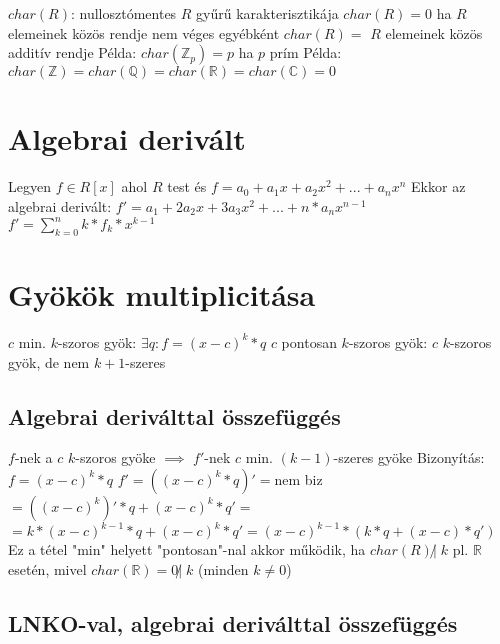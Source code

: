\documentclass[12pt,a4paper]{article}
\begin{document}
\begin{outline}
	\1 $char(R)$: nullosztómentes $R$ gyűrű karakterisztikája
		\2 $char(R)=0$ ha $R$ elemeinek közös rendje nem véges
		\2 egyébként $char(R)=$ $R$ elemeinek közös additív rendje
	\1 Példa: $char(\mathbb{Z}_p) = p$ ha $p$ prím
	\1 Példa: $char(\mathbb{Z})=char(\mathbb{Q})=char(\mathbb{R})=char(\mathbb{C})=0$
\end{outline}

\pagebreak

\section{Algebrai derivált}

\begin{outline}
	\1 Legyen $f \in R[x]$ ahol $R$ test és $f=a_0+a_1x+a_2x^2+...+a_nx^n$
	\1 Ekkor az algebrai derivált: $f'=a_1+2a_2x+3a_3x^2+...+n*a_nx^{n-1}$
		\2 $f'=\sum_{k=0}^{n} k*f_k*x^{k-1}$
\end{outline}

\section{Gyökök multiplicitása}

\begin{outline}
	\1 $c$ min. $k$-szoros gyök: $\exists q: f=(x-c)^k*q$
	\1 $c$ pontosan $k$-szoros gyök: $c$ $k$-szoros gyök, de nem $k+1$-szeres
\end{outline}

\subsection{Algebrai deriválttal összefüggés}

\begin{outline}
	\1 $f$-nek a $c$ $k$-szoros gyöke $\implies$ $f'$-nek $c$ min. $(k-1)$-szeres gyöke
	\1 Bizonyítás:
		\2 $f=(x-c)^k*q$
		\2 $f'=((x-c)^k*q)'=$nem biz$=((x-c)^k)'*q+(x-c)^k*q'=$\\
		$=k*(x-c)^{k-1}*q+(x-c)^k*q'=(x-c)^{k-1}*(k*q+(x-c)*q')$
	\1 Ez a tétel "min" helyett "pontosan"-nal akkor működik, ha $char(R) \not |\; k$
		\2 pl. $\mathbb{R}$ esetén, mivel $char(\mathbb{R})=0 \not |\; k$ (minden $k \ne 0$)
\end{outline}

\subsection{LNKO-val, algebrai deriválttal összefüggés}
\end{document}
